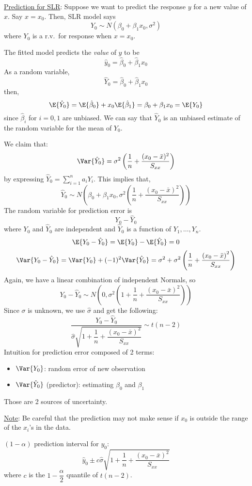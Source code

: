 \underline{Prediction for SLR}: Suppose
we want to predict the response $ y $
for a new value of $ x $. Say $ x=x_0 $. Then,
SLR model says
\[ Y_0 \sim N(\beta_0+\beta_1 x_0,\sigma^2) \]
where $ Y_0 $ is a r.v.\ for response when $ x=x_0 $.

The fitted model predicts the \emph{value} of $ y $
to be
\[ \hat{y}_0=\hat{\beta}_0+\hat{\beta}_1x_0 \]
As a random variable,
\[ \hat{Y}_0=\hat{\beta}_0+\hat{\beta}_1x_0 \]
then,
\[ \E{\hat{Y}_0}=\E{\hat{\beta}_0}+x_0\E{\hat{\beta}_1}=
    \beta_0+\beta_1x_0=\E{Y_0} \]
since $ \hat{\beta}_i $ for $ i=0,1 $ are unbiased.
We can say that $ \hat{Y}_0 $ is an unbiased estimate
of the random variable for the mean of $ Y_0 $.

We claim that:
\[  \Var{\hat{Y}_0}=\sigma^2\left( \frac{1}{n} +\frac{(x_0-\bar{x})^2}{S_{xx}}  \right) \]
by expressing $ \hat{Y}_0=\sum\limits_{i=1}^{n} a_i Y_i $. This implies
that,
\[ \hat{Y}_0 \sim N\left( \beta_0+\beta_1x_0,
    \sigma^2\left( \frac{1}{n} +\frac{\left( x_0-\bar{x} \right)^2}{S_{xx}}  \right) \right) \]
The random variable for prediction error is
\[ Y_0-\hat{Y}_0 \]
where $ Y_0 $ and $ \hat{Y}_0 $ are independent
and $ \hat{Y}_0 $ is a function of $ Y_1,\ldots,Y_n $.
\[ \E{Y_0-\hat{Y}_0}=\E{Y_0}-\E{\hat{Y}_0}=0 \]
\[ \Var{Y_0-\hat{Y}_0}=\Var{Y_0}+(-1)^2\Var{\hat{Y}_0}
    =\sigma^2+\sigma^2\left( \frac{1}{n} +\frac{\left( x_0-\bar{x} \right)^2}{S_{xx}} \right)
\]
Again, we have a linear combination of independent Normals, so
\[ Y_0-\hat{Y}_0
    \sim N\left( 0,\sigma^2\left( 1+\frac{1}{n}+\frac{\left( x_0-\bar{x} \right)^2}{S_{xx}}  \right) \right) \]
Since $ \sigma $ is unknown, we use $ \hat{\sigma} $ and get the following:
\[ \frac{Y_0-\hat{Y}_0}{
        \hat{\sigma}\sqrt{1+\dfrac{1}{n}+\dfrac{(x_0-\bar{x})^2}{S_{xx}}}
    } \sim t(n-2) \]
Intuition for prediction error composed of 2 terms:
\begin{itemize}
    \item $ \Var{Y_0} $: random error of new observation
    \item $ \Var{\hat{Y}_0} $ (predictor): estimating $ \beta_0 $ and $ \beta_1 $
\end{itemize}
Those are 2 sources of uncertainty.

\underline{Note}: Be careful that the prediction may not make sense if
$ x_0 $ is outside the range of the $ x_i $'s in the data.

$ (1-\alpha) $ prediction interval for $ y_0 $:
\[ \hat{y}_0\pm c \hat{\sigma}\sqrt{1+\dfrac{1}{n}+\dfrac{(x_0-\bar{x})^2}{S_{xx}}}
\]
where $ c $ is the $ 1-\dfrac{\alpha}{2} $ quantile of $ t(n-2) $.

